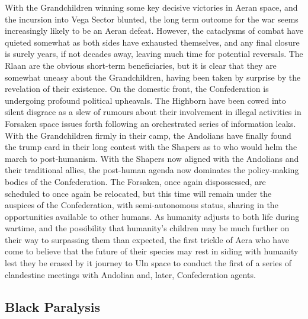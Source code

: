 With the Grandchildren winning some key decisive victories in Aeran
space, and the incursion into Vega Sector blunted, the long term
outcome for the war seems increasingly likely to be an Aeran
defeat. However, the cataclysms of combat have quieted somewhat as
both sides have exhausted themselves, and any final closure is surely
years, if not decades away, leaving much time for potential
reversals. The Rlaan are the obvious short-term beneficiaries, but it
is clear that they are somewhat uneasy about the Grandchildren, having
been taken by surprise by the revelation of their existence. On the
domestic front, the Confederation is undergoing profound political
upheavals. The Highborn have been cowed into silent disgrace as a slew
of rumours about their involvement in illegal activities in Forsaken
space issues forth following an orchestrated series of information
leaks. With the Grandchildren firmly in their camp, the Andolians have
finally found the trump card in their long contest with the Shapers as
to who would helm the march to post-humanism. With the Shapers now
aligned with the Andolians and their traditional allies, the
post-human agenda now dominates the policy-making bodies of the
Confederation. The Forsaken, once again dispossessed, are scheduled to
once again be relocated, but this time will remain under the auspices
of the Confederation, with semi-autonomous status, sharing in the
opportunities available to other humans. As humanity adjusts to both
life during wartime, and the possibility that humanity's children may
be much further on their way to surpassing them than expected, the
first trickle of Aera who have come to believe that the future of
their species may rest in siding with humanity lest they be erased by
it journey to Uln space to conduct the first of a series of
clandestine meetings with Andolian and, later, Confederation agents.

\subsection{Black Paralysis}

